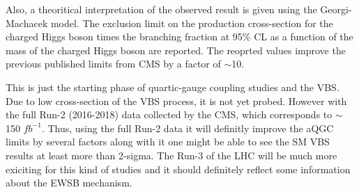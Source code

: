 Also, a theoritical interpretation of the observed result is given using the Georgi-Machacek model. The exclusion limit on the production cross-section for the charged Higgs boson times the branching fraction at 95\% CL as a function of the mass of the charged Higgs boson are reported. The reoprted values improve the previous published limits from CMS by a factor of $\sim$10.

This is just the starting phase of quartic-gauge coupling studies and the VBS. Due to low cross-section of the VBS process, it is not yet probed. However with the full Run-2 (2016-2018) data collected by the CMS, which corresponds to $\sim$150 $fb^{-1}$. Thus, using the full Run-2 data it will definitly improve the aQGC limits by several factors along with it one might be able to see the SM VBS results at least more than 2-sigma. The Run-3 of the LHC will be much more exiciting for this kind of studies and it should definitely reflect some information about the EWSB mechanism.



